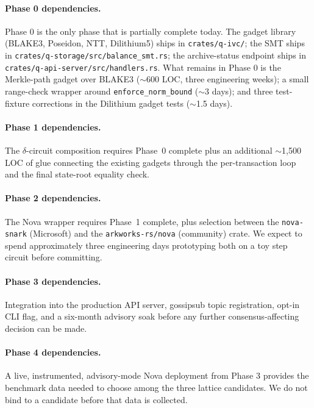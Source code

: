 \documentclass[11pt,a4paper]{article}
\begin{document}
\paragraph{Phase 0 dependencies.} Phase 0 is the only phase that is
partially complete today. The gadget library (BLAKE3, Poseidon, NTT,
Dilithium5) ships in \texttt{crates/q-ivc/}; the SMT ships in
\texttt{crates/q-storage/src/balance\_smt.rs}; the archive-status
endpoint ships in \texttt{crates/q-api-server/src/handlers.rs}. What
remains in Phase 0 is the Merkle-path gadget over BLAKE3
($\sim$600 LOC, three engineering weeks); a small range-check
wrapper around \texttt{enforce\_norm\_bound} ($\sim$3 days); and
three test-fixture corrections in the Dilithium gadget tests
($\sim$1.5 days).

\paragraph{Phase 1 dependencies.} The $\delta$-circuit composition
requires Phase~0 complete plus an additional $\sim$1{,}500 LOC of
glue connecting the existing gadgets through the per-transaction loop
and the final state-root equality check.

\paragraph{Phase 2 dependencies.} The Nova wrapper requires Phase~1
complete, plus selection between the \texttt{nova-snark} (Microsoft)
and the \texttt{arkworks-rs/nova} (community) crate. We expect to
spend approximately three engineering days prototyping both on a toy
step circuit before committing.

\paragraph{Phase 3 dependencies.} Integration into the production API
server, gossipsub topic registration, opt-in CLI flag, and a six-month
advisory soak before any further consensus-affecting decision can be
made.

\paragraph{Phase 4 dependencies.} A live, instrumented, advisory-mode
Nova deployment from Phase 3 provides the benchmark data needed to
choose among the three lattice candidates. We do not bind to a
candidate before that data is collected.
\end{document}
